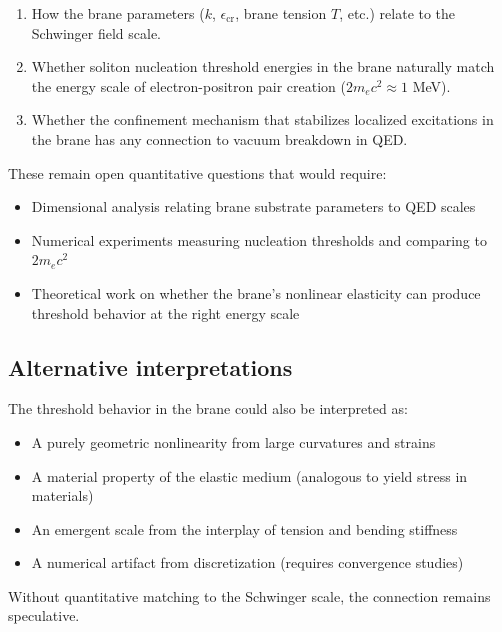 \documentclass[11pt,a4paper]{article}
\begin{document}
\begin{enumerate}
\item How the brane parameters ($k$, $\epsilon_{\text{cr}}$, brane tension $T$, etc.) relate to
      the Schwinger field scale.
\item Whether soliton nucleation threshold energies in the brane naturally match the
      energy scale of electron-positron pair creation ($2m_e c^2 \approx 1$ MeV).
\item Whether the confinement mechanism that stabilizes localized excitations in the brane
      has any connection to vacuum breakdown in QED.
\end{enumerate}

These remain open quantitative questions that would require:
\begin{itemize}
\item Dimensional analysis relating brane substrate parameters to QED scales
\item Numerical experiments measuring nucleation thresholds and comparing to $2m_e c^2$
\item Theoretical work on whether the brane's nonlinear elasticity can produce
      threshold behavior at the right energy scale
\end{itemize}

\subsection{Alternative interpretations}

The threshold behavior in the brane could also be interpreted as:
\begin{itemize}
\item A purely geometric nonlinearity from large curvatures and strains
\item A material property of the elastic medium (analogous to yield stress in materials)
\item An emergent scale from the interplay of tension and bending stiffness
\item A numerical artifact from discretization (requires convergence studies)
\end{itemize}

Without quantitative matching to the Schwinger scale, the connection remains speculative.
\end{document}
